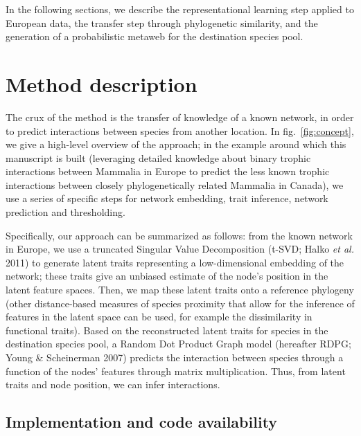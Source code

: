 \documentclass[10pt,oneside]{article}
\begin{document}
In the following sections, we describe the representational learning
step applied to European data, the transfer step through phylogenetic
similarity, and the generation of a probabilistic metaweb for the
destination species pool.

\hypertarget{method-description}{%
\section{Method description}\label{method-description}}

The crux of the method is the transfer of knowledge of a known network,
in order to predict interactions between species from another location.
In fig.~\ref{fig:concept}, we give a high-level overview of the
approach; in the example around which this manuscript is built
(leveraging detailed knowledge about binary trophic interactions between
Mammalia in Europe to predict the less known trophic interactions
between closely phylogenetically related Mammalia in Canada), we use a
series of specific steps for network embedding, trait inference, network
prediction and thresholding.

Specifically, our approach can be summarized as follows: from the known
network in Europe, we use a truncated Singular Value Decomposition
(t-SVD; Halko \emph{et al.} 2011) to generate latent traits representing
a low-dimensional embedding of the network; these traits give an
unbiased estimate of the node's position in the latent feature spaces.
Then, we map these latent traits onto a reference phylogeny (other
distance-based measures of species proximity that allow for the
inference of features in the latent space can be used, for example the
dissimilarity in functional traits). Based on the reconstructed latent
traits for species in the destination species pool, a Random Dot Product
Graph model (hereafter RDPG; Young \& Scheinerman 2007) predicts the
interaction between species through a function of the nodes' features
through matrix multiplication. Thus, from latent traits and node
position, we can infer interactions.

\hypertarget{implementation-and-code-availability}{%
\subsection{Implementation and code
availability}\label{implementation-and-code-availability}}
\end{document}
